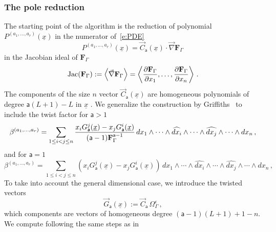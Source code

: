 \documentclass[a4paper,12pt]{article}
\numberwithin{equation}{section}
\numberwithin{figure}{section}
\begin{document}
  \subsubsection{The pole reduction}\label{sec:PoleRed}
The starting point of the algorithm is the reduction of polynomial
$P^{(a_1,\dots,a_r)}(\underline x)$  in the numerator
of~\eqref{e:PDE}
\begin{equation}\label{e:RedF}
	P^{(a_1,\dots,a_r)}(\underline x) = \vec C_{\mathsf{a}}(\underline x)\cdot
	\vec\nabla   \textbf{F}_\Gamma \, 
\end{equation}
in the Jacobian ideal of $\textbf{F}_\Gamma$ 
 \begin{equation}
	\textrm{Jac}(   \textbf{F}_\Gamma) :=\left\langle\vec\nabla  \textbf{F}_\Gamma \right\rangle =\left\langle{\partial
		\textbf{F}_\Gamma\over\partial x_1},\dots,  {\partial
		\textbf{F}_\Gamma\over\partial x_n}\right\rangle\,.
\end{equation}
%
The components of the size $n$ vector $ \vec C_{\mathsf{a}}(\underline x)$ are homogeneous polynomials of degree
$\mathsf{a}(L+1)-L$ in  $\underline x$ . 
%
   We generalize the construction by
   Griffiths~\cite{Griffith1,Griffith2} to include the twist factor
   for $\mathsf{a}>1$ 
   \begin{equation}\label{e:betadef}
  \beta^{(a_1,\dots,a_r)}=  \sum_{1\leq i<j\leq n} {x_i
    G_{\mathsf{a}}^j  (\underline x)-x_j
   G_{\mathsf{a}}^i(\underline x)\over
    (\mathsf{a}-1)\textbf{F}_\Gamma^{\mathsf{a}-1}}\, 
 dx_1\wedge \cdots \wedge \widehat{dx_i}\wedge \cdots \wedge\widehat{dx_j}\wedge
  \cdots \wedge dx_n \, ,
\end{equation}
and for $\mathsf{a}=1$
  \begin{equation}\label{e:betadefa1}
  \beta^{(a_1,\dots,a_r)}=  \sum_{1\leq i<j\leq n} \left(x_i
    G_{\mathsf{a}}^j  (\underline x)-x_j
   G_{\mathsf{a}}^i(\underline x)\right)\, 
 dx_1\wedge \cdots \wedge \widehat{dx_i}\wedge \cdots \wedge\widehat{dx_j}\wedge
  \cdots \wedge dx_n \, ,
\end{equation}
To take into account the general dimensional case, we introduce 
the twisted vectors 
\begin{equation}
  \label{e:Gdef}
\vec  G_{\mathsf{a}}(\underline x):=   \vec C_{\mathsf{a}} \,\Omega_\Gamma^\epsilon \, ,
\end{equation}
which components are vectors of homogeneous degree $(\mathsf{a}-1)(L+1)+1-n$. 
We compute following the same steps as in~\cite{Griffiths_1969}
\end{document}

